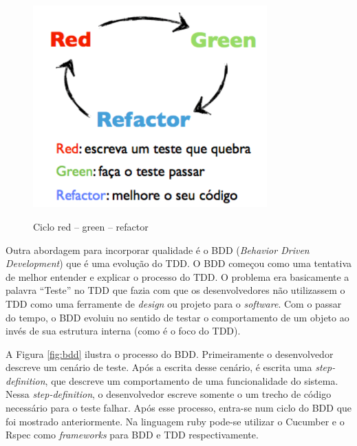 \begin{figure}[htb!]
\begin{center}
\caption{Ciclo red -- green -- refactor}
\label{fig:tdd}
\includegraphics[width=9cm]{assets/tdd} \\
\end{center}
\end{figure}	

Outra abordagem para incorporar qualidade é o BDD (\textit{Behavior Driven Development}) que é uma evolução do TDD. O BDD começou como uma tentativa de melhor entender e explicar o processo do TDD. O problema era basicamente a palavra ``Teste'' no TDD que fazia com que os desenvolvedores não utilizassem o TDD como uma ferramente de \textit{design} ou projeto para o \textit{software}. Com o passar do tempo, o BDD evoluiu no sentido de testar o comportamento de um objeto ao invés de sua estrutura interna (como é o foco do TDD). \cite{chelimsky:12}


A Figura \ref{fig:bdd} ilustra o processo do BDD. Primeiramente o desenvolvedor descreve um cenário de teste. Após a escrita desse cenário, é escrita uma \textit{step-definition}, que descreve um comportamento de uma funcionalidade do sistema. Nessa \textit{step-definition}, o desenvolvedor escreve somente o um trecho de código necessário para o teste falhar. Após esse processo, entra-se num ciclo do BDD que foi mostrado anteriormente. Na linguagem ruby pode-se utilizar o Cucumber e o Rspec como \textit{frameworks} para BDD e TDD respectivamente.

